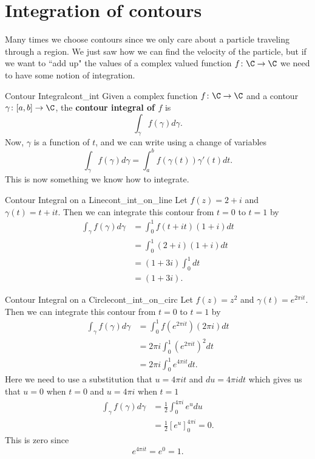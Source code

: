         \section{Integration of contours}
        Many times we choose contours since we only care about a particle traveling through a region.  We just saw how we can find the velocity of the particle, but if we want to ``add up" the values of a complex valued function $f\colon \C \to \C$ we need to have some notion of integration.
        
        \begin{df}{Contour Integral}{cont_int}
        Given a complex function $f\colon \C \to \C$ and a contour $\gamma \colon [a,b] \to \C$, the \textbf{contour integral of $f$} is
        \[
        \int_\gamma f(\gamma)d\gamma.
        \]
        Now, $\gamma$ is a function of $t$, and we can write using a change of variables
        \[
        \int_\gamma f(\gamma)d\gamma = \int_a^b f(\gamma(t))\gamma'(t)dt.
        \]
        This is now something we know how to integrate.
        \end{df}
        
        \begin{ex}{Contour Integral on a Line}{cont_int_on_line}
        Let $f(z)=2+i$ and $\gamma(t)=t+it$.  Then we can integrate this contour from $t=0$ to $t=1$ by
        \begin{align*}
        \int_\gamma f(\gamma)d\gamma &= \int_0^1 f(t+it)(1+i)dt\\
        &= \int_0^1 (2+i)(1+i)dt\\
        &=(1+3i)\int_0^1 dt\\
        &=(1+3i).
        \end{align*}
        \end{ex}
        
        \begin{ex}{Contour Integral on a Circle}{cont_int_on_circ}
        Let $f(z)=z^2$ and $\gamma(t)=e^{2\pi i t}$. Then we can integrate this contour from $t=0$ to $t=1$ by
        \begin{align*}
            \int_\gamma f(\gamma)d\gamma &= \int_0^1 f\left(e^{2\pi i t}\right) (2\pi i)dt\\
            &= 2\pi i \int_0^1 \left(e^{2\pi i t}\right)^2 dt\\
            &= 2\pi i \int_0^1 e^{4\pi i t} dt.
        \end{align*}
        Here we need to use a substitution that $u=4\pi i t$ and $du=4\pi i dt$ which gives us that $u=0$ when $t=0$ and $u=4\pi i$ when $t=1$
        \begin{align*}
            \int_\gamma f(\gamma)d\gamma &= \frac{1}{2}\int_0^{4\pi i} e^u du\\
            &= \frac{1}{2} \left[ e^u \right]_0^{4\pi i}=0.
        \end{align*}
        This is zero since
        \[
        e^{4\pi i t}=e^0=1.
        \]
        \end{ex}
        
